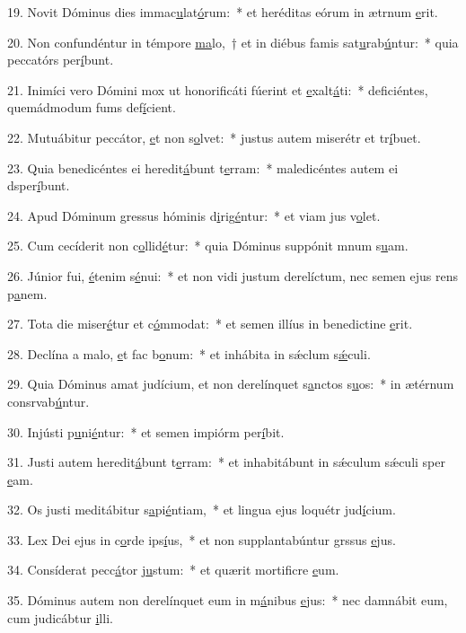 19. Novit Dóminus dies immac\uline{u}lat\uline{ó}rum:~* et heréditas eórum in ætrnum \uline{e}rit.\par 
20. Non confundéntur in témpore \uline{ma}lo,~† et in diébus famis sat\uline{u}rab\uline{ú}ntur:~* quia peccatórs per\uline{í}bunt.\par 
21. Inimíci vero Dómini mox ut honorificáti fúerint et \uline{e}xalt\uline{á}ti:~* deficiéntes, quemádmodum fums def\uline{í}cient.\par 
22. Mutuábitur peccátor, \uline{e}t non s\uline{o}lvet:~* justus autem miserétr et tr\uline{í}buet.\par 
23. Quia benedicéntes ei heredit\uline{á}bunt t\uline{e}rram:~* maledicéntes autem ei dsper\uline{í}bunt.\par 
24. Apud Dóminum gressus hóminis d\uline{i}rig\uline{é}ntur:~* et viam jus v\uline{o}let.\par 
25. Cum cecíderit non c\uline{o}llid\uline{é}tur:~* quia Dóminus suppónit mnum s\uline{u}am.\par 
26. Júnior fui, \uline{é}tenim s\uline{é}nui:~* et non vidi justum derelíctum, nec semen ejus rens p\uline{a}nem.\par 
27. Tota die miser\uline{é}tur et c\uline{ó}mmodat:~* et semen illíus in benedictine \uline{e}rit.\par 
28. Declína a malo, \uline{e}t fac b\uline{o}num:~* et inhábita in sǽclum s\uline{ǽ}culi.\par 
29. Quia Dóminus amat judícium, et non derelínquet s\uline{a}nctos s\uline{u}os:~* in ætérnum consrvab\uline{ú}ntur.\par 
30. Injústi p\uline{u}ni\uline{é}ntur:~* et semen impiórm per\uline{í}bit.\par 
31. Justi autem heredit\uline{á}bunt t\uline{e}rram:~* et inhabitábunt in sǽculum sǽculi sper \uline{e}am.\par 
32. Os justi meditábitur s\uline{a}pi\uline{é}ntiam,~* et lingua ejus loquétr jud\uline{í}cium.\par 
33. Lex Dei ejus in c\uline{o}rde ips\uline{í}us,~* et non supplantabúntur grssus \uline{e}jus.\par 
34. Consíderat pecc\uline{á}tor j\uline{u}stum:~* et quærit mortificre \uline{e}um.\par 
35. Dóminus autem non derelínquet eum in m\uline{á}nibus \uline{e}jus:~* nec damnábit eum, cum judicábtur \uline{i}lli.\par 
